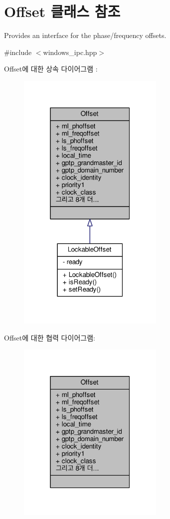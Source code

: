 \hypertarget{class_offset}{}\section{Offset 클래스 참조}
\label{class_offset}


Provides an interface for the phase/frequency offsets.  




{\ttfamily \#include $<$windows\+\_\+ipc.\+hpp$>$}



Offset에 대한 상속 다이어그램 \+: 
\nopagebreak
\begin{figure}[H]
\begin{center}
\leavevmode
\includegraphics[width=199pt]{class_offset__inherit__graph}
\end{center}
\end{figure}


Offset에 대한 협력 다이어그램\+:
\nopagebreak
\begin{figure}[H]
\begin{center}
\leavevmode
\includegraphics[width=199pt]{class_offset__coll__graph}
\end{center}
\end{figure}
